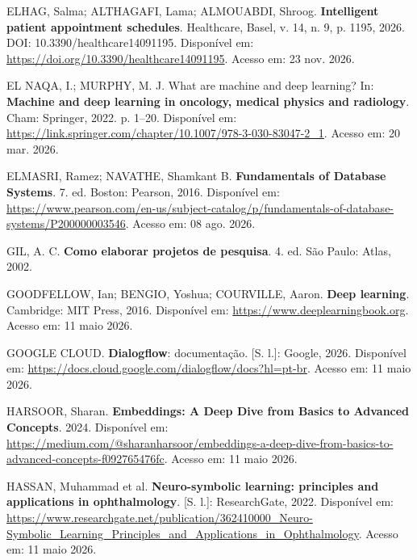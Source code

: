 \documentclass[12pt,a4paper]{extarticle}
\begin{document}
\vspace{0.5cm}\noindent
ELHAG, Salma; ALTHAGAFI, Lama; ALMOUABDI, Shroog. \textbf{Intelligent patient appointment schedules}. Healthcare, Basel, v. 14, n. 9, p. 1195, 2026. DOI: 10.3390/healthcare14091195. Disponível em: \url{https://doi.org/10.3390/healthcare14091195}. Acesso em: 23 nov. 2026.

\vspace{0.5cm}\noindent
EL NAQA, I.; MURPHY, M. J. What are machine and deep learning? In: \textbf{Machine and deep learning in oncology, medical physics and radiology}. Cham: Springer, 2022. p. 1--20. Disponível em: \url{https://link.springer.com/chapter/10.1007/978-3-030-83047-2_1}. Acesso em: 20 mar. 2026.

\vspace{0.5cm}\noindent
ELMASRI, Ramez; NAVATHE, Shamkant B. \textbf{Fundamentals of Database Systems}. 7. ed. Boston: Pearson, 2016. Disponível em: \url{https://www.pearson.com/en-us/subject-catalog/p/fundamentals-of-database-systems/P200000003546}. Acesso em: 08 ago. 2026.

\vspace{0.5cm}\noindent
GIL, A. C. \textbf{Como elaborar projetos de pesquisa}. 4. ed. São Paulo: Atlas, 2002.

\vspace{0.5cm}\noindent
GOODFELLOW, Ian; BENGIO, Yoshua; COURVILLE, Aaron. \textbf{Deep learning}. Cambridge: MIT Press, 2016. Disponível em: \url{https://www.deeplearningbook.org}. Acesso em: 11 maio 2026.

\vspace{0.5cm}\noindent
GOOGLE CLOUD. \textbf{Dialogflow}: documentação. [S. l.]: Google, 2026. Disponível em: \url{https://docs.cloud.google.com/dialogflow/docs?hl=pt-br}. Acesso em: 11 maio 2026.

\vspace{0.5cm}\noindent
HARSOOR, Sharan. \textbf{Embeddings: A Deep Dive from Basics to Advanced Concepts}. 2024. Disponível em: \url{https://medium.com/@sharanharsoor/embeddings-a-deep-dive-from-basics-to-advanced-concepts-f092765476fc}. Acesso em: 11 maio 2026.

\vspace{0.5cm}\noindent
HASSAN, Muhammad et al. \textbf{Neuro-symbolic learning: principles and applications in ophthalmology}. [S. l.]: ResearchGate, 2022. Disponível em: \url{https://www.researchgate.net/publication/362410000_Neuro-Symbolic_Learning_Principles_and_Applications_in_Ophthalmology}. Acesso em: 11 maio 2026.
\end{document}

